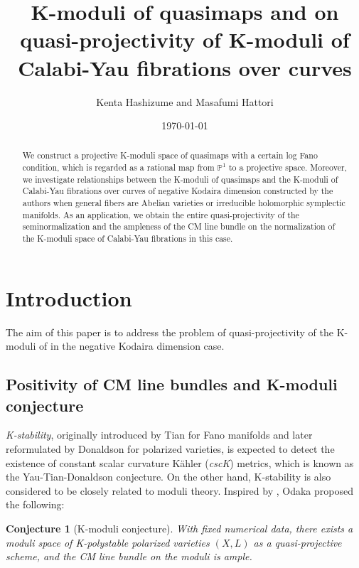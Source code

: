\documentclass[12pt,twoside]{amsart}
\title[K-moduli of quasimaps]{K-moduli of quasimaps and on quasi-projectivity of K-moduli of Calabi-Yau fibrations over curves}
\author{Kenta Hashizume and Masafumi Hattori}
\date{\today}
\newtheorem{conj}[thm]{Conjecture}
\theoremstyle{definition}
\begin{document}
\begin{abstract}
  We construct a projective K-moduli space of quasimaps with a certain log Fano condition, which is regarded as a rational map from $\mathbb{P}^1$ to a projective space.  
  Moreover, we investigate relationships between the K-moduli of quasimaps and the K-moduli of Calabi-Yau fibrations over curves of negative Kodaira dimension constructed by the authors when general fibers are Abelian varieties or irreducible holomorphic symplectic manifolds.
  As an application, we obtain the entire quasi-projectivity of the seminormalization and the ampleness of the CM line bundle on the normalization of the K-moduli space of Calabi-Yau fibrations in this case.
\end{abstract}
\maketitle

\setcounter{tocdepth}{3}
\tableofcontents

\section{Introduction}


The aim of this paper is to address the problem of quasi-projectivity of the K-moduli of \cite{HH} in the negative Kodaira dimension case. 



\subsection{Positivity of CM line bundles and K-moduli conjecture}

{\it K-stability}, originally introduced by Tian \cite{Tia97} for Fano manifolds and later reformulated by Donaldson \cite{Dn2} for polarized varieties, is expected to detect the existence of constant scalar curvature K\"ahler ({\it cscK}) metrics, which is known as the Yau-Tian-Donaldson conjecture.
On the other hand, 
K-stability is also considered to be closely related to moduli theory. Inspired by \cite{KSB,FS,O}, Odaka \cite{Oconj} proposed the following:

\begin{conj}[K-moduli conjecture]\label{conj--k-moduli} With fixed numerical data, there exists a moduli space of K-polystable polarized varieties 
$(X,L)$ as a quasi-projective scheme, and the CM line bundle on the moduli is ample. 
\end{conj}
\end{document}
